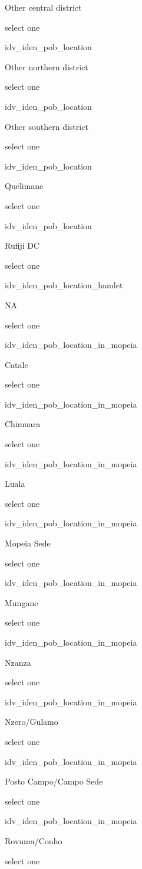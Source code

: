 \documentclass[]{article}
\begin{document}
Other central district

select one

idv\_iden\_pob\_location

Other northern district

select one

idv\_iden\_pob\_location

Other southern district

select one

idv\_iden\_pob\_location

Quelimane

select one

idv\_iden\_pob\_location

Rufiji DC

select one

idv\_iden\_pob\_location\_hamlet

NA

select one

idv\_iden\_pob\_location\_in\_mopeia

Catale

select one

idv\_iden\_pob\_location\_in\_mopeia

Chimuara

select one

idv\_iden\_pob\_location\_in\_mopeia

Luala

select one

idv\_iden\_pob\_location\_in\_mopeia

Mopeia Sede

select one

idv\_iden\_pob\_location\_in\_mopeia

Mungane

select one

idv\_iden\_pob\_location\_in\_mopeia

Nzanza

select one

idv\_iden\_pob\_location\_in\_mopeia

Nzero/Gulamo

select one

idv\_iden\_pob\_location\_in\_mopeia

Posto Campo/Campo Sede

select one

idv\_iden\_pob\_location\_in\_mopeia

Rovuma/Conho

select one
\end{document}
